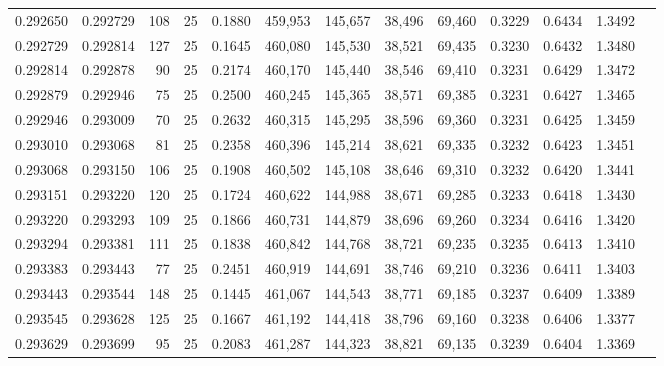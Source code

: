 \begin{tabular}{rrrrrrrrrrrrr}
0.292650 & 0.292729 &   108 &  25 &                                     0.1880 & 459,953 & 145,657 &  38,496 &  69,460 & 0.3229 & 0.6434 & 1.3492 \\
0.292729 & 0.292814 &   127 &  25 &                                     0.1645 & 460,080 & 145,530 &  38,521 &  69,435 & 0.3230 & 0.6432 & 1.3480 \\
0.292814 & 0.292878 &    90 &  25 &                                     0.2174 & 460,170 & 145,440 &  38,546 &  69,410 & 0.3231 & 0.6429 & 1.3472 \\
0.292879 & 0.292946 &    75 &  25 &                                     0.2500 & 460,245 & 145,365 &  38,571 &  69,385 & 0.3231 & 0.6427 & 1.3465 \\
0.292946 & 0.293009 &    70 &  25 &                                     0.2632 & 460,315 & 145,295 &  38,596 &  69,360 & 0.3231 & 0.6425 & 1.3459 \\
0.293010 & 0.293068 &    81 &  25 &                                     0.2358 & 460,396 & 145,214 &  38,621 &  69,335 & 0.3232 & 0.6423 & 1.3451 \\
0.293068 & 0.293150 &   106 &  25 &                                     0.1908 & 460,502 & 145,108 &  38,646 &  69,310 & 0.3232 & 0.6420 & 1.3441 \\
0.293151 & 0.293220 &   120 &  25 &                                     0.1724 & 460,622 & 144,988 &  38,671 &  69,285 & 0.3233 & 0.6418 & 1.3430 \\
0.293220 & 0.293293 &   109 &  25 &                                     0.1866 & 460,731 & 144,879 &  38,696 &  69,260 & 0.3234 & 0.6416 & 1.3420 \\
0.293294 & 0.293381 &   111 &  25 &                                     0.1838 & 460,842 & 144,768 &  38,721 &  69,235 & 0.3235 & 0.6413 & 1.3410 \\
0.293383 & 0.293443 &    77 &  25 &                                     0.2451 & 460,919 & 144,691 &  38,746 &  69,210 & 0.3236 & 0.6411 & 1.3403 \\
0.293443 & 0.293544 &   148 &  25 &                                     0.1445 & 461,067 & 144,543 &  38,771 &  69,185 & 0.3237 & 0.6409 & 1.3389 \\
0.293545 & 0.293628 &   125 &  25 &                                     0.1667 & 461,192 & 144,418 &  38,796 &  69,160 & 0.3238 & 0.6406 & 1.3377 \\
0.293629 & 0.293699 &    95 &  25 &                                     0.2083 & 461,287 & 144,323 &  38,821 &  69,135 & 0.3239 & 0.6404 & 1.3369 \\

\end{tabular}

